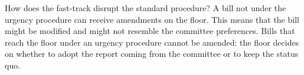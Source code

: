 \documentclass[letter,12pt]{article}
\begin{document}

How does the fast-track disrupt the standard procedure? A bill not under the urgency procedure can receive amendments on the floor. This means that the bill might be modified and might not resemble the committee preferences. Bills that reach the floor under an urgency procedure cannot be amended: the floor decides on whether to adopt the report coming from the committee or to keep the status quo. 

\end{document}
